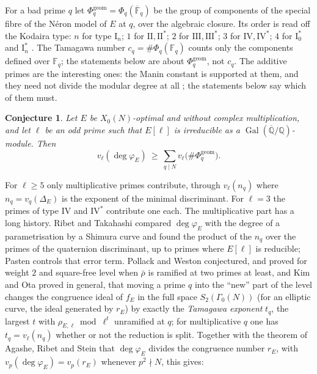\documentclass[11pt]{amsart}
\newtheorem{conjecture}[theorem]{Conjecture}
\theoremstyle{definition}
\newcommand{\Q}{\mathbb{Q}}
\newcommand{\F}{\mathbb{F}}
\newcommand{\degphi}{\deg\varphi_E}
\newcommand{\Phig}{\Phi^{\mathrm{geom}}}
\newcommand{\Gal}{\operatorname{Gal}}
\begin{document}
For a bad prime $q$ let $\Phig_q = \Phi_q(\overline{\F}_q)$ be the group of components of the special fibre of the N\'eron model of $E$ at $q$, over the algebraic closure. Its order is read off the Kodaira type: $n$ for type $\mathrm{I}_n$; $1$ for $\mathrm{II},\mathrm{II}^*$; $2$ for $\mathrm{III},\mathrm{III}^*$; $3$ for $\mathrm{IV},\mathrm{IV}^*$; $4$ for $\mathrm{I}_0^*$ and $\mathrm{I}_n^*$ \cite[IV.9]{SilvermanATAEC}. The Tamagawa number $c_q=\#\Phi_q(\F_q)$ counts only the components defined over $\F_q$; the statements below are about $\Phig_q$, not $c_q$. The additive primes are the interesting ones: the Manin constant is supported at them, and they need not divide the modular degree at all \cite{CNS24}; the statements below say which of them must.

\begin{conjecture}\label{conj:main}
Let $E$ be $X_0(N)$-optimal and without complex multiplication, and let $\ell$ be an odd prime such that $E[\ell]$ is irreducible as a $\Gal(\overline{\Q}/\Q)$-module. Then
\begin{equation}\label{eq:main}
v_\ell(\degphi)\ \ge\ \sum_{q\mid N} v_\ell\bigl(\#\Phig_q\bigr).
\end{equation}
\end{conjecture}

For $\ell\ge5$ only multiplicative primes contribute, through $v_\ell(n_q)$ where $n_q=v_q(\Delta_E)$ is the exponent of the minimal discriminant. For $\ell=3$ the primes of type $\mathrm{IV}$ and $\mathrm{IV}^*$ contribute one each. The multiplicative part has a long history. Ribet and Takahashi \cite{RibetTakahashi97,Takahashi01} compared $\degphi$ with the degree of a parametrisation by a Shimura curve and found the product of the $n_q$ over the primes of the quaternion discriminant, up to primes where $E[\ell]$ is reducible; Pasten \cite{Pasten} controls that error term. Pollack and Weston \cite{PollackWeston11} conjectured, and proved for weight $2$ and square-free level when $\bar\rho$ is ramified at two primes at least, and Kim and Ota \cite{KimOta} proved in general, that moving a prime $q$ into the ``new'' part of the level changes the congruence ideal of $f_E$ in the full space $S_2(\Gamma_0(N))$ (for an elliptic curve, the ideal generated by $r_E$) by exactly the \emph{Tamagawa exponent} $t_q$, the largest $t$ with $\rho_{E,\ell}\bmod\ell^t$ unramified at $q$; for multiplicative $q$ one has $t_q=v_\ell(n_q)$ whether or not the reduction is split. Together with the theorem of Agashe, Ribet and Stein \cite{ARS12} that $\degphi$ divides the congruence number $r_E$, with $v_p(\degphi)=v_p(r_E)$ whenever $p^2\nmid N$, this gives:
\end{document}
